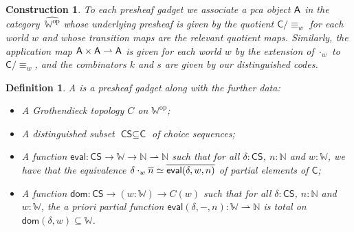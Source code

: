 \documentclass[11pt]{article}
\newtheorem{defn}[thrm]{Definition}
\newtheorem{cons}[thrm]{Construction}
\begin{document}
\begin{cons}
  To each presheaf gadget we associate a pca object \(\mathsf{A}\) in the
  category~\(\widehat{\mathbb{W}^{\text{op}}}\) whose underlying presheaf
  is given by the quotient \({\mathsf{C}}/{\equiv_{w}}\) for each world \(w\)
  and whose transition maps are the relevant quotient maps.
  Similarly, the application map \(\mathsf{A} \times \mathsf{A} \rightharpoonup \mathsf{A}\) is given
  for each world \(w\) by the extension of \(\cdot_{w}\) to
  \({\mathsf{C}}/{\equiv_{w}}\), and the combinators \(k\) and \(s\) are given
  by our distinguished codes.
\end{cons}

\begin{defn}
  A  is a
  presheaf gadget along with the further data:
  \begin{itemize}
    \item A Grothendieck topology \(C\) on \(\mathbb{W}^{\text{op}}\);
    \item A distinguished subset \(\textsf{CS} \subseteq \textsf{C}\) of choice
      sequences;
    \item A function
      \(\textsf{eval} : \textsf{CS} \to \mathbb{W} \to \mathbb{N} \rightharpoonup \mathbb{N}\)
      such that for all \(\delta : \textsf{CS}\), \(n : \mathbb{N}\) and
      \(w : \mathbb{W}\), we have that the equivalence
      \({\delta \cdot_{w} \overline{n}}\simeq{\overline{\textsf{eval}(\delta,w,n)}}\)
      of partial elements of \(\textsf{C}\);
    \item A function
      \(\textsf{dom} : \textsf{CS} \to (w : \mathbb{W}) \to C(w)\) such that for
      all \(\delta : \textsf{CS}\), \(n : \mathbb{N}\) and \(w : \mathbb{W}\),
      the a priori partial function
      \(\textsf{eval}(\delta,-,n) : \mathbb{W} \rightharpoonup \mathbb{N}\) is
      total on \(\textsf{dom}(\delta,w)\subseteq \mathbb{W}\).
  \end{itemize}
\end{defn}

\newpage

\printbibliography{}
\end{document}
